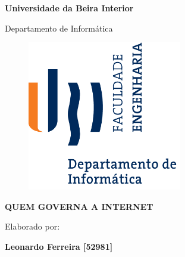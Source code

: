 
\thispagestyle{empty}
\setcounter{page}{-1}

\begin{center}
\begin{Huge}
\textbf{Universidade da Beira Interior}
\end{Huge}
\end{center}

\begin{center}
\begin{Huge}
Departamento de Informática
\end{Huge}
\end{center}

\vspace{0,07cm}
\begin{figure}[!htb]
\centering
\includegraphics[width=191pt]{ubi-fe-di.png}
\end{figure}

\vspace{0.5cm}
\begin{center}
\begin{Large}
\textbf{QUEM GOVERNA A INTERNET}
\end{Large}
\end{center}


\vspace{0.5cm}
\begin{center}
\begin{normalsize}
\begin{large}
Elaborado por:
\end{large}
\end{normalsize}
\end{center}

\vspace{0.2cm}
\begin{center}
\begin{large}
\textbf{Leonardo Ferreira [52981]}
\end{large}
\end{center}

